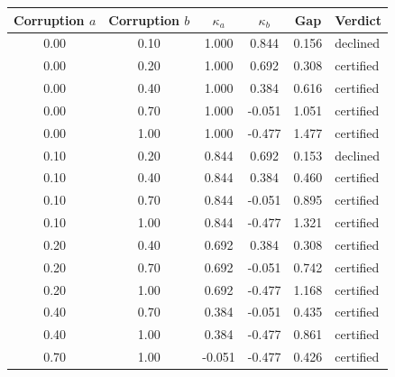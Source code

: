 \begin{tabular}{cccccl}
\toprule
Corruption $a$ & Corruption $b$ & $\kappa_a$ & $\kappa_b$ & Gap & Verdict \\
\midrule
0.00 & 0.10 & 1.000 & 0.844 & 0.156 & declined \\
0.00 & 0.20 & 1.000 & 0.692 & 0.308 & certified \\
0.00 & 0.40 & 1.000 & 0.384 & 0.616 & certified \\
0.00 & 0.70 & 1.000 & -0.051 & 1.051 & certified \\
0.00 & 1.00 & 1.000 & -0.477 & 1.477 & certified \\
0.10 & 0.20 & 0.844 & 0.692 & 0.153 & declined \\
0.10 & 0.40 & 0.844 & 0.384 & 0.460 & certified \\
0.10 & 0.70 & 0.844 & -0.051 & 0.895 & certified \\
0.10 & 1.00 & 0.844 & -0.477 & 1.321 & certified \\
0.20 & 0.40 & 0.692 & 0.384 & 0.308 & certified \\
0.20 & 0.70 & 0.692 & -0.051 & 0.742 & certified \\
0.20 & 1.00 & 0.692 & -0.477 & 1.168 & certified \\
0.40 & 0.70 & 0.384 & -0.051 & 0.435 & certified \\
0.40 & 1.00 & 0.384 & -0.477 & 0.861 & certified \\
0.70 & 1.00 & -0.051 & -0.477 & 0.426 & certified \\
\bottomrule
\end{tabular}